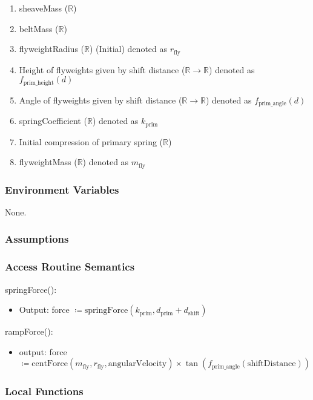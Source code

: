 \documentclass[12pt, titlepage]{article}
\begin{document}
\begin{enumerate}
  \item sheaveMass ($\mathbb{R}$)
  \item beltMass ($\mathbb{R}$)
  \item flyweightRadius ($\mathbb{R}$) (Initial) denoted as $r_{\text{fly}}$
  \item Height of flyweights given by shift distance ($\mathbb{R} \rightarrow \mathbb{R}$) denoted as $f_{\text{prim\_height}}(d)$
  \item Angle of flyweights given by shift distance ($\mathbb{R} \rightarrow \mathbb{R}$) denoted as $f_{\text{prim\_angle}}(d)$
  \item springCoefficient ($\mathbb{R}$) denoted as $k_{\text{prim}}$

  \item Initial compression of primary spring ($\mathbb{R}$)
  \item flyweightMass ($\mathbb{R}$) denoted as $m_\text{fly}$
\end{enumerate}

\subsubsection{Environment Variables}
None.

\subsubsection{Assumptions}

\subsubsection{Access Routine Semantics}

\noindent springForce():
\begin{itemize}
  \item Output: force $\coloneq \text{springForce} (k_{\text{prim}}, d_{\text{prim}} + d_{\text{shift}})$
\end{itemize}

\noindent rampForce():
\begin{itemize}
\item output: force $\coloneq \text{centForce}(m_\text{fly}, r_{\text{fly}}, \text{angularVelocity}) \times \tan(f_{\text{prim\_angle}}(\text{shiftDistance})) $
\end{itemize}

\subsubsection{Local Functions}
\end{document}

